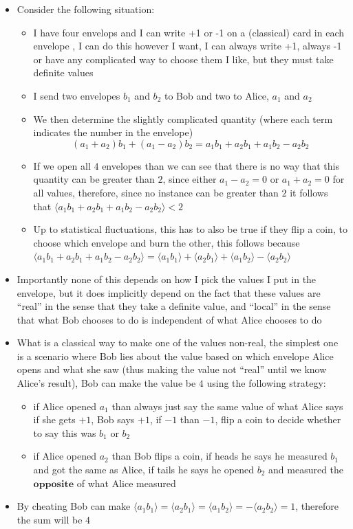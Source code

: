 \documentclass[english]{article}
\newcommand{\average}[1]{\langle #1 \rangle}
\begin{document}
\begin{itemize}
\item Consider the following situation:
\begin{itemize}
\item I have four envelops and I can write +1 or -1 on a (classical) card in each envelope , I can do this however I want, I can always write +1, always -1 or have any complicated way to choose them I like, but they must take definite values
\item I send two envelopes $b_1$ and $b_2$ to Bob and two to Alice, $a_1$ and $a_2$
\item We then determine the slightly complicated quantity (where each term indicates the number in the envelope)
\begin{equation}
(a_1+a_2)b_1+(a_1-a_2)b_2=a_1b_1+a_2b_1+a_1b_2-a_2b_2
\end{equation}
\item If we open all $4$ envelopes than we can see that there is no way that this quantity can be greater than $2$, since either $a_1-a_2=0$ or $a_1+a_2=0$ for all values, therefore, since no instance can be greater than $2$ it follows that $\average{a_1b_1+a_2b_1+a_1b_2-a_2b_2}<2$
\item Up to statistical fluctuations, this has to also be true if they flip a coin, to choose which envelope and burn the other, this follows because $\average{a_1b_1+a_2b_1+a_1b_2-a_2b_2}=\average{a_1b_1}+\average{a_2b_1}+\average{a_1b_2}-\average{a_2b_2}$
\end{itemize}
\item Importantly none of this depends on how I pick the values I put in the envelope, but it does implicitly depend on the fact that these values are ``real'' in the sense that they take a definite value, and ``local'' in the sense that what Bob chooses to do is independent of what Alice chooses to do
\item What is a classical way to make one of the values non-real, the simplest one is a scenario where Bob lies about the value based on which envelope Alice opens and what she saw (thus making the value not ``real'' until we know Alice's result), Bob can make the value be $4$ using the following strategy:
\begin{itemize}
\item if Alice opened $a_1$ than always just say the same value of what Alice says if she gets $+1$, Bob says $+1$, if $-1$ than $-1$, flip a coin to decide whether to say this was $b_1$ or $b_2$
\item if Alice opened $a_2$ than Bob flips a coin, if heads he says he measured $b_1$ and got the same as Alice, if tails he says he opened $b_2$ and measured the $\textbf{opposite}$ of what Alice measured
\end{itemize}
\item By cheating Bob can make $\average{a_1b_1}=\average{a_2b_1}=\average{a_1b_2}=-\average{a_2b_2}=1$, therefore the sum will be $4$
\end{itemize}
\end{document}
